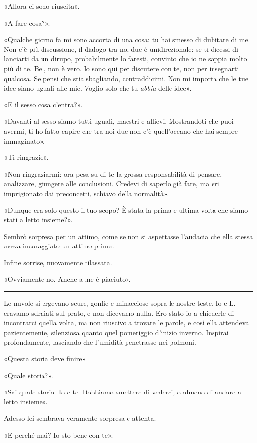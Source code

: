 \documentclass[a4paper,10pt]{memoir}
\begin{document}
«Allora ci sono riuscita».

«A fare cosa?».

«Qualche giorno fa mi sono accorta di una cosa: tu hai smesso di dubitare di me. Non c'è più discussione, il dialogo tra
noi due è unidirezionale: se ti dicessi di lanciarti da un dirupo, probabilmente lo faresti, convinto che io ne sappia
molto più di te. Be', non è vero. Io sono qui per discutere con te, non per insegnarti qualcosa. Se pensi che stia
sbagliando, contraddicimi. Non mi importa che le tue idee siano uguali alle mie. Voglio solo che tu \emph{abbia} delle
idee».

«E il sesso cosa c'entra?».

«Davanti al sesso siamo tutti uguali, maestri e allievi. Mostrandoti che puoi avermi, ti ho fatto capire che tra noi due
non c'è quell'oceano che hai sempre immaginato».

«Ti ringrazio».

«Non ringraziarmi: ora pesa su di te la grossa responsabilità di pensare, analizzare, giungere alle conclusioni. Credevi
di saperlo già fare, ma eri imprigionato dai preconcetti, schiavo della normalità».

«Dunque era solo questo il tuo scopo? È stata la prima e ultima volta che siamo stati a letto insieme?».

Sembrò sorpresa per un attimo, come se non si aspettasse l'audacia che ella stessa aveva incoraggiato un attimo prima.

Infine sorrise, nuovamente rilassata.

«Ovviamente no. Anche a me è piaciuto».

\plainbreak{1}

Le nuvole si ergevano scure, gonfie e minacciose sopra le nostre teste. Io e L. eravamo sdraiati sul prato, e non
dicevamo nulla. Ero stato io a chiederle di incontrarci quella volta, ma non riuscivo a trovare le parole, e così ella
attendeva pazientemente, silenziosa quanto quel pomeriggio d'inizio inverno. Inspirai profondamente, lasciando che
l'umidità penetrasse nei polmoni.

«Questa storia deve finire».

«Quale storia?».

«Sai quale storia. Io e te. Dobbiamo smettere di vederci, o almeno di andare a letto insieme».

Adesso lei sembrava veramente sorpresa e attenta.

«E perché mai? Io sto bene con te».
\end{document}
